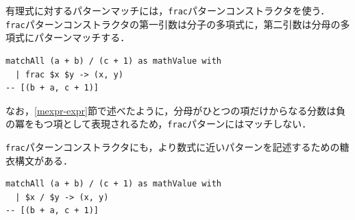 有理式に対するパターンマッチには，\lstinline{frac}パターンコンストラクタを使う．
\lstinline{frac}パターンコンストラクタの第一引数は分子の多項式に，第二引数は分母の多項式にパターンマッチする．
\begin{lstlisting}[language=egison,numbers=none]
matchAll (a + b) / (c + 1) as mathValue with
  | frac $x $y -> (x, y)
-- [(b + a, c + 1)]
\end{lstlisting}
なお，\ref{mexpr-expr}節で述べたように，分母がひとつの項だけからなる分数は負の冪をもつ項として表現されるため，\lstinline{frac}パターンにはマッチしない．

\lstinline{frac}パターンコンストラクタにも，より数式に近いパターンを記述するための糖衣構文がある．
\begin{lstlisting}[language=egison,numbers=none]
matchAll (a + b) / (c + 1) as mathValue with
  | $x / $y -> (x, y)
-- [(b + a, c + 1)]
\end{lstlisting}
